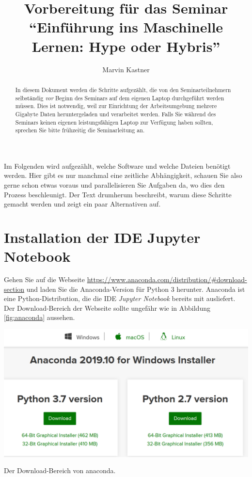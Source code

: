 \documentclass{tufte-handout}
\title{Vorbereitung für das Seminar \enquote{Einführung ins Maschinelle Lernen: Hype oder Hybris}}
\author{Marvin Kastner}
\begin{document}
\maketitle%

\begin{abstract}
\noindent
In diesem Dokument werden die Schritte aufgezählt, die von den Seminarteilnehmern selbständig \emph{vor} Beginn des Seminars auf dem eigenen Laptop durchgeführt werden müssen.
Dies ist notwendig, weil zur Einrichtung der Arbeitsumgebung mehrere Gigabyte Daten heruntergeladen und verarbeitet werden.
Falls Sie während des Seminars keinen eigenen leistungsfähigen Laptop zur Verfügung haben sollten, sprechen Sie bitte frühzeitig die Seminarleitung an.
\end{abstract}

Im Folgenden wird aufgezählt, welche Software und welche Dateien benötigt werden.
Hier gibt es nur manchmal eine zeitliche Abhängigkeit, schauen Sie also gerne schon etwas voraus und parallelisieren Sie Aufgaben da, wo dies den Prozess beschleunigt.
Der Text drumherum beschreibt, warum diese Schritte gemacht werden und zeigt ein paar Alternativen auf.

\section{Installation der IDE Jupyter Notebook}

Gehen Sie auf die Webseite
\url{https://www.anaconda.com/distribution/#download-section} 
und laden Sie die Anaconda-Version für Python 3 herunter.
Anaconda ist eine Python-Distribution, die die IDE \emph{Jupyter Notebook} bereits mit ausliefert.
Der Download-Bereich der Webseite sollte ungefähr wie in Abbildung\,\ref{fig:anaconda} aussehen.

\begin{marginfigure}
  \includegraphics{anaconda}
  \caption{Der Download-Bereich von anaconda.}%
\label{fig:anaconda}
\end{marginfigure}
\end{document}
